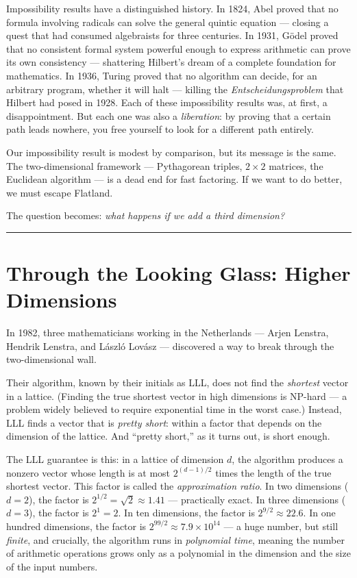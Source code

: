 Impossibility results have a distinguished history. In 1824, Abel proved that no formula involving radicals can solve the general quintic equation --- closing a quest that had consumed algebraists for three centuries. In 1931, Gödel proved that no consistent formal system powerful enough to express arithmetic can prove its own consistency --- shattering Hilbert's dream of a complete foundation for mathematics. In 1936, Turing proved that no algorithm can decide, for an arbitrary program, whether it will halt --- killing the \emph{Entscheidungsproblem} that Hilbert had posed in 1928. Each of these impossibility results was, at first, a disappointment. But each one was also a \emph{liberation}: by proving that a certain path leads nowhere, you free yourself to look for a different path entirely.

Our impossibility result is modest by comparison, but its message is the same. The two-dimensional framework --- Pythagorean triples, \(2 \times 2\) matrices, the Euclidean algorithm --- is a dead end for fast factoring. If we want to do better, we must escape Flatland.

The question becomes: \emph{what happens if we add a third dimension?}

\bigskip\noindent\rule{\linewidth}{0.4pt}\bigskip

\section{Through the Looking Glass: Higher Dimensions}
In 1982, three mathematicians working in the Netherlands --- Arjen Lenstra, Hendrik Lenstra, and László Lovász --- discovered a way to break through the two-dimensional wall.

Their algorithm, known by their initials as LLL, does not find the \emph{shortest} vector in a lattice. (Finding the true shortest vector in high dimensions is NP-hard --- a problem widely believed to require exponential time in the worst case.) Instead, LLL finds a vector that is \emph{pretty short}: within a factor that depends on the dimension of the lattice. And ``pretty short,'' as it turns out, is short enough.

The LLL guarantee is this: in a lattice of dimension \(d\), the algorithm produces a nonzero vector whose length is at most \(2^{(d-1)/2}\) times the length of the true shortest vector. This factor is called the \emph{approximation ratio}. In two dimensions (\(d = 2\)), the factor is \(2^{1/2} = \sqrt{2} \approx 1.41\) --- practically exact. In three dimensions (\(d = 3\)), the factor is \(2^1 = 2\). In ten dimensions, the factor is \(2^{9/2} \approx 22.6\). In one hundred dimensions, the factor is \(2^{99/2} \approx 7.9 \times 10^{14}\) --- a huge number, but still \emph{finite}, and crucially, the algorithm runs in \emph{polynomial time}, meaning the number of arithmetic operations grows only as a polynomial in the dimension and the size of the input numbers.

